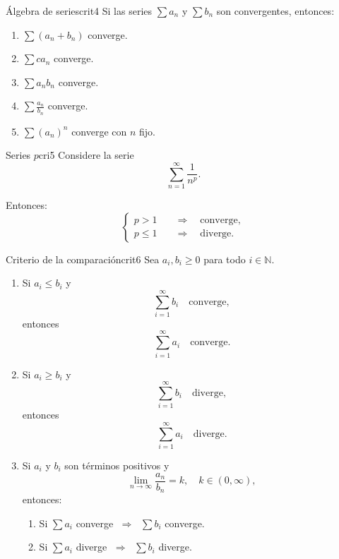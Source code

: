 \documentclass[12pt,a4paper]{article}
\begin{document}
\begin{teorema}{Álgebra de series}{crit4}
    Si las series $\sum a_n$ y $\sum b_n$ son convergentes, entonces:
    \begin{enumerate}
        \item $\sum (a_n + b_n)$ converge.
        \item $\sum c a_n$ converge.
        \item $\sum a_n b_n$ converge.
        \item $\sum \frac{a_n}{b_n}$ converge.
        \item $\sum (a_n)^n$ converge con $n$ fijo.
    \end{enumerate}
\end{teorema}

\begin{teorema}{Series $p$}{cri5}
    Considere la serie
    \[
        \sum_{n=1}^{\infty} \frac{1}{n^p}.
    \]

    Entonces:
    \[
        \begin{cases}
            p > 1 \quad &\Rightarrow \quad \text{converge}, \\
            p \leq 1 \quad &\Rightarrow \quad \text{diverge}.
        \end{cases}
    \]
\end{teorema}

\begin{teorema}{Criterio de la comparación}{crit6}
    Sea $a_i, b_i \geq 0$ para todo $i \in \mathbb{N}$.
    \begin{enumerate}
        \item Si $a_i \leq b_i$ y 
        \[
            \sum_{i=1}^{\infty} b_i \quad \text{converge},
        \]
        entonces 
        \[
            \sum_{i=1}^{\infty} a_i \quad \text{converge}.
        \]

        \item Si $a_i \geq b_i$ y 
        \[
            \sum_{i=1}^{\infty} b_i \quad \text{diverge},
        \]
        entonces 
        \[
            \sum_{i=1}^{\infty} a_i \quad \text{diverge}.
        \]

        \item Si $a_i$ y $b_i$ son términos positivos y 
        \[
            \lim_{n \to \infty} \frac{a_n}{b_n} = k, \quad k \in (0,\infty),
        \]
        entonces:
        \begin{enumerate}[label=\roman*)]
            \item Si $\sum a_i$ converge $\;\Rightarrow\;$ $\sum b_i$ converge.
            \item Si $\sum a_i$ diverge $\;\Rightarrow\;$ $\sum b_i$ diverge.
        \end{enumerate}
    \end{enumerate}
\end{teorema}
\end{document}
